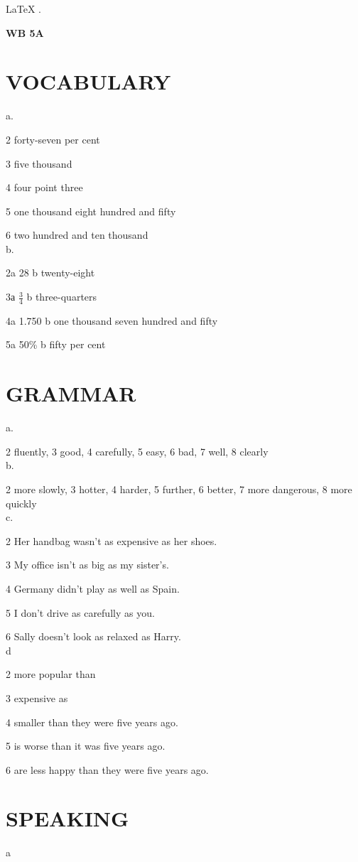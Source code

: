 \documentclass{article}
\begin{document}
\begin{center}
    \color{pink}
    \LARGE
    \LaTeX
    \color{lime}
    .
\end{center}

\textbf{WB 5A}
\section*{VOCABULARY}
a.

2 forty-seven per cent

3 five thousand

4 four point three

5 one thousand eight hundred and fifty

6 two hundred and ten thousand 
\\
b.

2a 28 b twenty-eight

3а $\frac{3}{4}$ b three-quarters

4a 1.750 b one thousand seven hundred and fifty

5a 50\%  b fifty per cent
\section*{GRAMMAR}

a.

2 fluently, 3 good, 4 carefully, 5 easy, 6 bad, 7 well, 8 clearly
\\
b.

2 more slowly, 3 hotter, 4 harder, 5 further, 6 better, 7 more dangerous, 8 more quickly
\\
c.

2 Her handbag wasn't as expensive as her shoes.

3 My office isn't as big as my sister's.

4 Germany didn't play as well as Spain.

5 I don't drive as carefully as you.

6 Sally doesn't look as relaxed as Harry. 
\\
d

2 more popular than

3 expensive as

4 smaller than they were five years ago.

5 is worse than it was five years ago.

6 are less happy than they were five years ago.

\section*{SPEAKING}
a 
\end{document}
